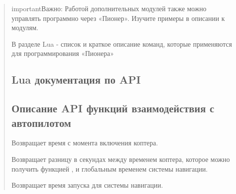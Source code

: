 \documentclass[a4paper,10pt,russian]{sphinxmanual}
\begin{document}
\begin{quote}
\begin{sphinxadmonition}{important}{Важно:}
Работой дополнительных модулей также можно управлять программно через «Пионер». Изучите примеры в описании к модулям.
\end{sphinxadmonition}

В разделе Lua  - список и краткое описание команд, которые применяются для программирования «Пионера»


\subsection{Lua документация по API}
\label{\detokenize{programming/lua/lua:lua-api}}\label{\detokenize{programming/lua/lua::doc}}

\subsection{Описание API функций взаимодействия с автопилотом}
\label{\detokenize{programming/lua/lua:api}}

\begin{fulllineitems}
\label{\detokenize{programming/lua/lua:time}}
Возвращает время с момента включения коптера.

\end{fulllineitems}


\begin{fulllineitems}
\label{\detokenize{programming/lua/lua:deltaTime}}
Возвращает разницу в секундах между временем коптера, которое можно получить функцией {\hyperref[\detokenize{programming/lua/lua:time}]{}}, и глобальным временем системы навигации.

\end{fulllineitems}


\begin{fulllineitems}
\label{\detokenize{programming/lua/lua:launchTime}}
Возвращает время запуска для системы навигации.

\end{fulllineitems}


\end{quote}
\end{document}
